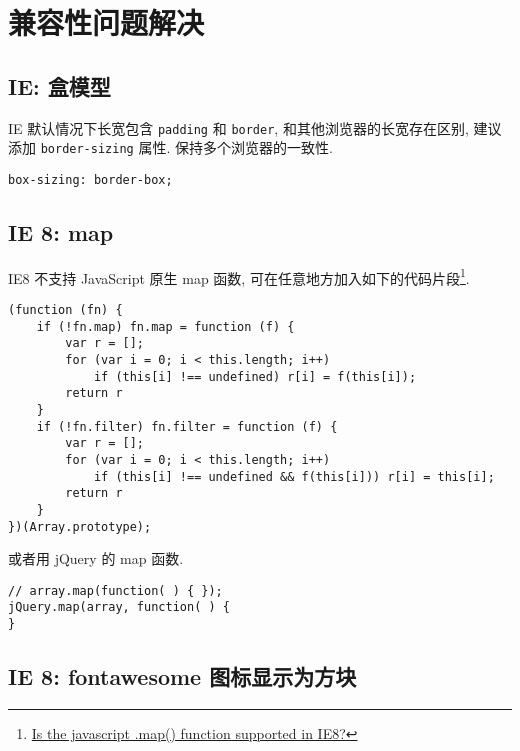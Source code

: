 \section{兼容性问题解决}\label{ux517cux5bb9ux6027ux95eeux9898ux89e3ux51b3}

\subsection{IE: 盒模型}\label{ie-ux76d2ux6a21ux578b}

IE 默认情况下长宽包含 \lstinline!padding! 和 \lstinline!border!,
和其他浏览器的长宽存在区别, 建议添加 \lstinline!border-sizing! 属性.
保持多个浏览器的一致性.

\begin{lstlisting}
box-sizing: border-box;
\end{lstlisting}

\subsection{IE 8: map}\label{ie-8-map}

IE8 不支持 JavaScript 原生 map 函数,
可在任意地方加入如下的代码片段\footnote{\href{http://stackoverflow.com/questions/7350912/is-the-javascript-map-function-supported-in-ie8}{Is
  the javascript .map() function supported in IE8?}}.

\begin{lstlisting}
(function (fn) {
    if (!fn.map) fn.map = function (f) {
        var r = [];
        for (var i = 0; i < this.length; i++)
            if (this[i] !== undefined) r[i] = f(this[i]);
        return r
    }
    if (!fn.filter) fn.filter = function (f) {
        var r = [];
        for (var i = 0; i < this.length; i++)
            if (this[i] !== undefined && f(this[i])) r[i] = this[i];
        return r
    }
})(Array.prototype);
\end{lstlisting}

或者用 jQuery 的 map 函数.

\begin{lstlisting}
// array.map(function( ) { });
jQuery.map(array, function( ) {
}
\end{lstlisting}

\subsection{IE 8: fontawesome
图标显示为方块}\label{ie-8-fontawesome-ux56feux6807ux663eux793aux4e3aux65b9ux5757}

